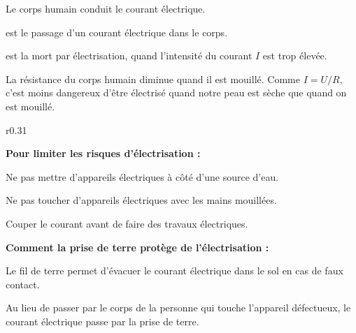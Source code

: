 
\pointCyan Le corps humain conduit le courant électrique.

\pointCyan {} est le passage d'un courant électrique dans le corps.

\pointCyan {} est la mort par électrisation, quand l'intensité du courant $I$ est trop élevée.

\pointCyan La résistance du corps humain diminue quand il est mouillé.
Comme $I = U / R$, c'est moins dangereux d'être électrisé quand notre peau est sèche que quand on est mouillé.

\medskip
\begin{wrapfigure}[3]{r}{0.31\linewidth}
  \centering
\end{wrapfigure}

\textbf{Pour limiter les risques d'électrisation :}
\begin{listePoints}
  \item Ne pas mettre d'appareils électriques à côté d'une source d'eau.
  \item Ne pas toucher d'appareils électriques avec les mains mouillées.
  \item Couper le courant avant de faire des travaux électriques.
\end{listePoints}

\medskip
\textbf{Comment la prise de terre protège de l'électrisation :}

\begin{encart}
  Le fil de terre permet d'évacuer le courant électrique dans le sol en cas de faux contact.
  
  Au lieu de passer par le corps de la personne qui touche l'appareil défectueux, le courant électrique passe par la prise de terre.
\end{encart}

